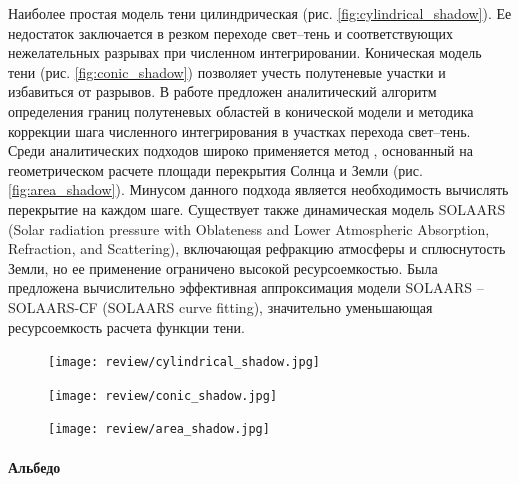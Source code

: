Наиболее простая модель тени цилиндрическая (рис. \ref{fig:cylindrical_shadow}). Ее недостаток заключается в резком переходе
свет--тень и соответствующих нежелательных разрывах при численном интегрировании.
Коническая модель тени (рис. \ref{fig:conic_shadow}) позволяет учесть полутеневые участки и избавиться от разрывов.
В работе \cite{kuznetsov2024} предложен аналитический алгоритм определения границ полутеневых областей в конической модели
и методика коррекции шага численного интегрирования в участках перехода свет--тень. 
Среди аналитических подходов широко применяется метод \cite{zhang2019}, основанный на геометрическом
расчете площади перекрытия Солнца и Земли (рис. \ref{fig:area_shadow}). Минусом данного подхода является необходимость
вычислять перекрытие на каждом шаге. 
Существует также динамическая модель SOLAARS 
(Solar radiation pressure with Oblateness and Lower Atmospheric Absorption, Refraction, and Scattering), включающая рефракцию атмосферы и
сплюснутость Земли, но ее применение ограничено высокой ресурсоемкостью. Была предложена
вычислительно эффективная аппроксимация модели SOLAARS -- SOLAARS-СF (SOLAARS curve fitting), значительно уменьшающая
ресурсоемкость расчета функции тени.

\begin{figure}[ht]
  \begin{minipage}[c]{0.68\textwidth}
    \centering
    \texttt{[image: review/cylindrical\_shadow.jpg]}
    \label{fig:cylindrical_shadow}
    
    \vspace{0.5cm} %
    
    \texttt{[image: review/conic\_shadow.jpg]}
    \label{fig:conic_shadow}
  \end{minipage}
  \hfill
  \begin{minipage}[c]{0.3\textwidth}
    \centering
    \texttt{[image: review/area\_shadow.jpg]}
    \label{fig:area_shadow}
  \end{minipage}

  \label{fig:combined}
\end{figure}

\paragraph{Альбедо} \mbox{} \\

